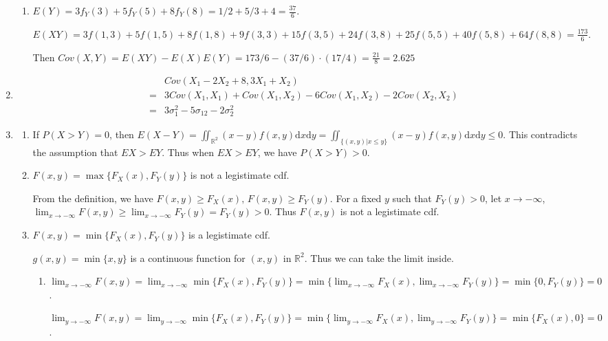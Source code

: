 \documentclass{article}
\begin{document}
\begin{enumerate}[leftmargin = 0 em, label = \arabic*., font = \bfseries]
\begin{enumerate}
		\item $E(Y) = 3f_Y(3) + 5f_Y(5) + 8f_Y(8) = 1/2 + 5/3 + 4 = \frac{37}{6}$.

		$E(XY) = 3 f(1,3) + 5 f(1,5) + 8 f(1,8) + 9 f(3,3) + 15 f(3,5) + 24 f(3,8) + 25 f(5,5) + 40 f(5,8) + 64 f(8,8) = \frac{173}{6}$.

		Then $Cov(X,Y) = E(XY) - E(X) E(Y) = 173/6 - (37/6) \cdot (17/4) = \frac{21}{8} = 2.625 $


	\end{enumerate}

	\item 
	\begin{align*}
	&Cov(X_1 - 2 X_2 + 8, 3 X_1 + X_2) \\
	=& 3 Cov(X_1, X_1) + Cov(X_1, X_2) - 6 Cov(X_1, X_2) - 2 Cov(X_2 , X_2)\\
	 =& 3 \sigma_1^2 - 5 \sigma_{12} - 2 \sigma_2^2
	\end{align*}


	\item 
	\begin{enumerate}
		\item If $P(X > Y) = 0$, then $E(X - Y) = \iint_{\mathbb{R}^2} (x - y) f(x, y)\mathrm{d}x \mathrm{d}y = \iint_{\{(x,y)|x \leq y\}} (x - y)f(x,y) \mathrm{d}x \mathrm{d}y \leq 0$. This contradicts the assumption that $EX > EY$. Thus when $EX > EY$, we have $P(X > Y) > 0$. 

		\item 
		$F(x,y) = \max\{F_X (x), F_Y (y)\}$ is not a legistimate cdf.

		 From the definition, we have $F(x,y) \geq F_X (x),\, F(x,y) \geq F_Y (y)$. For a fixed $y$ such that $F_Y(y) > 0$, let $x \to -\infty$, $\lim_{x\to -\infty} F(x,y) \geq \lim_{x \to -\infty} F_Y (y) = F_Y (y) > 0$. Thus $F(x,y)$ is not a legistimate cdf.


		 \item 
		 $F(x,y) = \min\{F_X (x), F_Y (y)\}$ is a legistimate cdf.

		 $g(x,y) = \min\{x, y\}$ is a continuous function for $(x,y)$ in $\mathbb{R}^2$. Thus we can take the limit inside.

		 \begin{enumerate}
		 	\item $\lim_{x \to -\infty} F(x,y) = \lim_{x\to -\infty}\min\{F_{X}(x), F_Y(y)\} = \min\{\lim_{x\to -\infty}F_{X}(x), \lim_{x\to -\infty} F_Y (y)\} = \min\{0, F_Y (y)\} = 0$.

		 	$\lim_{y \to -\infty} F(x,y) = \lim_{y\to -\infty}\min\{F_{X}(x), F_Y(y)\} = \min\{\lim_{y\to -\infty}F_{X}(x), \lim_{y\to -\infty} F_Y (y)\} = \min\{F_X (x), 0\} = 0$.



\end{enumerate}
\end{enumerate}
\end{enumerate}
\end{document}
